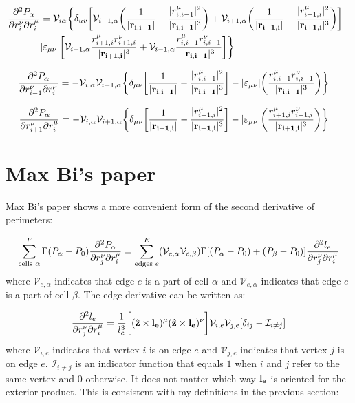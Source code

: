 \documentclass[12pt,a4paper]{article}
\begin{document}
\begin{align}
	\pdv[2]{P_\alpha}{r_i^\nu}{r_i^\mu} &= \mathcal{V}_{i\alpha} \bigg\{ \delta_{uv} \bigg[\mathcal{V}_{i-1,\alpha}\bigg(\frac{1}{|\vb{r_{i,i-1}}|} - \frac{|r_{i,i-1}^\mu|^2}{|\vb{r_{i,i-1}}|^3}\bigg) + \mathcal{V}_{i+1,\alpha}\bigg(\frac{1}{|\vb{r_{i+1,i}}|} - \frac{|r_{i+1,i}^\mu|^2}{|\vb{r_{i+1,i}}|^3}\bigg)\bigg] - \\
	 &|\varepsilon_{\mu \nu}|\bigg[\mathcal{V}_{i+1,\alpha}\frac{r_{i+1,i}^\mu r_{i+1,i}^\nu}{|\vb{r_{i+1,i}}|^3}+\mathcal{V}_{i-1,\alpha}\frac{r_{i,i-1}^\mu r_{i,i-1}^\nu}{|\vb{r_{i,i-1}}|^3}\bigg]\bigg\}
\end{align}

\begin{align}
	\pdv[2]{P_\alpha}{r_{i-1}^\nu}{r_i^\mu} &= -\mathcal{V}_{i,\alpha} \mathcal{V}_{i-1,\alpha}\bigg\{\delta_{\mu \nu}\bigg[\frac{1}{|\vb{r_{i,i-1}}|} - \frac{|r_{i,i-1}^\mu|^2}{|\vb{r_{i,i-1}}|^3}\bigg] - |\varepsilon_{\mu\nu}|\bigg(\frac{r_{i,i-1}^\mu r_{i,i-1}^\nu}{|\vb{r_{i,i-1}}|^3}\bigg)\bigg\}
\end{align}

\begin{align}
	\pdv[2]{P_\alpha}{r_{i+1}^\nu}{r_i^\mu} &= -\mathcal{V}_{i,\alpha} \mathcal{V}_{i+1,\alpha}\bigg\{\delta_{\mu \nu}\bigg[\frac{1}{|\vb{r_{i+1,i}}|} - \frac{|r_{i+1,i}^\mu|^2}{|\vb{r_{i+1,i}}|^3}\bigg] - |\varepsilon_{\mu\nu}|\bigg(\frac{r_{i+1,i}^\mu r_{i+1,i}^\nu}{|\vb{r_{i+1,i}}|^3}\bigg)\bigg\}
\end{align}


\section{Max Bi's paper}

Max Bi's paper shows a more convenient form of the second derivative of perimeters:

\begin{align}
	\sum\limits_{\text{cells } \alpha}^F \Gamma(P_{\alpha} - P_0) \pdv{P_\alpha}{r_j^{\nu}}{r_i^{\mu}} = \sum\limits_{\text{edges } e}^{E} (\mathcal{V}_{e, \alpha} \mathcal{V}_{e, \beta}) \Gamma[(P_{\alpha} - P_0)+(P_{\beta} - P_0)]\pdv{l_e}{r_j^{\nu}}{r_i^{\mu}} 
\end{align}
where $\mathcal{V}_{e, \alpha}$ indicates that edge $e$ is a part of cell $\alpha$ and $\mathcal{V}_{e, \alpha}$ indicates that edge $e$ is a part of cell $\beta$. The edge derivative can be written as:

\begin{align}
\pdv{l_e}{r_j^{\nu}}{r_i^{\mu}} = \frac{1}{l_e^3}\bigg[(\vu{z}\times \vb{l_e})^{\mu}(\vu{z}\times \vb{l_e})^{\nu} \bigg]\mathcal{V}_{i,e} \mathcal{V}_{j,e}[\delta_{ij} - \mathcal{I}_{i \neq j}]
\end{align}
where $\mathcal{V}_{i, e}$ indicates that vertex $i$ is on edge $e$ and $\mathcal{V}_{j,e}$ indicates that vertex $j$ is on edge $e$. $\mathcal{I}_{i \neq j}$ is an indicator function that equals $1$ when $i$ and $j$ refer to the same vertex and $0$ otherwise. It does not matter which way $\vb{l_e}$ is oriented for the exterior product. This is consistent with my definitions in the previous section:
\end{document}

